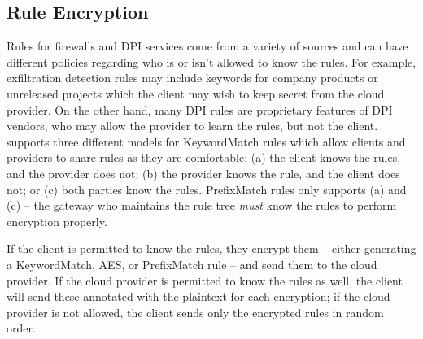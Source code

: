
\subsection{Rule Encryption}
\label{sec:rulenc}


Rules for firewalls and DPI services come from a variety of sources and can have different policies regarding who is or isn't allowed to know the rules. 
For example, exfiltration detection rules may include keywords for company products or unreleased projects which the client may wish to keep secret from the cloud provider. 
On the other hand, many DPI rules are proprietary features of DPI vendors, who may allow the provider to learn the rules, but not the client.
\sys supports three different models for KeywordMatch rules which allow clients and providers to share rules as they are comfortable: (a) the client knows the rules, and the provider does not; (b) the provider knows the rule, and the client does not; or (c) both parties know the rules.
PrefixMatch rules only supports (a) and (c) -- the gateway who maintains the rule tree {\it must} know the rules to perform encryption properly.

If the client is permitted to know the rules, they encrypt them -- either generating a KeywordMatch, AES, or PrefixMatch rule -- and send them to the cloud provider. If the cloud provider is permitted to know the rules as well, the client will send these annotated with the plaintext for each encryption; if the cloud provider is not allowed, the client sends only the encrypted rules in random order.

